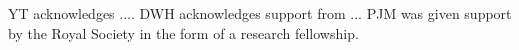 YT acknowledges ....
%
DWH acknowledges support from ...
% 
PJM was given support by the Royal 
Society in the form of a research fellowship.
%
